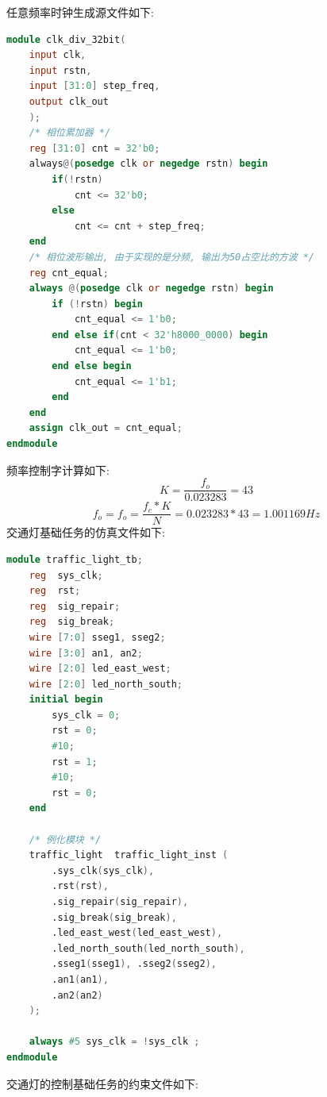 \documentclass{article}
\begin{document}
任意频率时钟生成源文件如下:
\begin{lstlisting}[language=Verilog, caption={任意频率生成源文件}]
module clk_div_32bit(
    input clk,
    input rstn,
    input [31:0] step_freq,
    output clk_out
    );
    /* 相位累加器 */
    reg [31:0] cnt = 32'b0;
    always@(posedge clk or negedge rstn) begin
        if(!rstn)  
            cnt <= 32'b0;
        else  
            cnt <= cnt + step_freq;
    end
    /* 相位波形输出, 由于实现的是分频, 输出为50占空比的方波 */
    reg cnt_equal;
    always @(posedge clk or negedge rstn) begin
        if (!rstn) begin
            cnt_equal <= 1'b0;
        end else if(cnt < 32'h8000_0000) begin
            cnt_equal <= 1'b0;
        end else begin
            cnt_equal <= 1'b1;  
        end
    end
    assign clk_out = cnt_equal;
endmodule
\end{lstlisting}
频率控制字计算如下:
$$K = \frac{f_o}{0.023283} = 43$$
$$f_o = f_o = \frac{f_c*K}{N} = 0.023283 * 43 = 1.001169Hz$$
交通灯基础任务的仿真文件如下:
\begin{lstlisting}[language=Verilog, caption={基础任务仿真文件}]
module traffic_light_tb;
    reg  sys_clk;
    reg  rst;
    reg  sig_repair;
    reg  sig_break;
    wire [7:0] sseg1, sseg2;
    wire [3:0] an1, an2;
    wire [2:0] led_east_west;
    wire [2:0] led_north_south;
    initial begin
        sys_clk = 0;
        rst = 0;
        #10;
        rst = 1;
        #10;
        rst = 0;
    end

    /* 例化模块 */
    traffic_light  traffic_light_inst (
        .sys_clk(sys_clk),
        .rst(rst),
        .sig_repair(sig_repair),
        .sig_break(sig_break),
        .led_east_west(led_east_west),
        .led_north_south(led_north_south),
        .sseg1(sseg1), .sseg2(sseg2),
        .an1(an1),
        .an2(an2)
    );

    always #5 sys_clk = !sys_clk ;
endmodule
\end{lstlisting}
交通灯的控制基础任务的约束文件如下:
\end{document}
